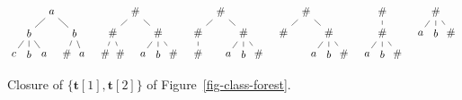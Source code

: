 \documentclass{CSML}
\newcommand\tree{\boldsymbol{t}}
\begin{document}
\begin{figure}
\[
\begin{tikzpicture}[baseline]
\node {$a$}  [level distance=7mm,
   level 1/.style={sibling distance=15mm},
   level 2/.style={sibling distance=5mm}]
 child { node {$b$}
         child { node {$c$} }
         child { node {$b$} }
         child { node {$a$} }
       }
 child { node {$b$}
         child { node {$\#$} }
         child { node {$a$} }
       };
\end{tikzpicture}
\quad\!
\begin{tikzpicture}[baseline]
\node {$\#$}[level distance=7mm,
   level 1/.style={sibling distance=15mm},
   level 2/.style={sibling distance=5mm}]
child { node {$\#$}
        child { node {$\#$} }
        child { node {$\#$} }
      }
child { node {$\#$}
        child { node {$a$} }
        child { node {$b$} }
        child { node {$\#$} }
      };
\end{tikzpicture}
\quad\!
\begin{tikzpicture}[baseline]
\node {$\#$}[level distance=7mm,
   level 1/.style={sibling distance=15mm},
   level 2/.style={sibling distance=5mm}]
child { node {$\#$}
        child { node {$\#$} }
      }
child { node {$\#$}
        child { node {$a$} }
        child { node {$b$} }
        child { node {$\#$} }
      };
\end{tikzpicture}
\quad\!
\begin{tikzpicture}[baseline]
\node {$\#$}[level distance=7mm,
   level 1/.style={sibling distance=15mm},
   level 2/.style={sibling distance=5mm}]
child { node {$\#$} }
child { node {$\#$}
        child { node {$a$} }
        child { node {$b$} }
        child { node {$\#$} }
      };
\end{tikzpicture}
\quad\!
\begin{tikzpicture}[baseline]
\node {$\#$}[level distance=7mm,
   level 1/.style={sibling distance=15mm},
   level 2/.style={sibling distance=5mm}]
child { node {$\#$}
        child { node {$a$} }
        child { node {$b$} }
        child { node {$\#$} }
      };
\end{tikzpicture}
\quad\!
\begin{tikzpicture}[baseline]
\node {$\#$}[level distance=7mm,
   level 1/.style={sibling distance=5mm},
   level 2/.style={sibling distance=5mm}]
         child { node {$a$} }
         child { node {$b$} }
         child { node {$\#$} };
\end{tikzpicture}
\]
\caption{Closure of $\{ \tree[1], \tree[2] \}$ of Figure~\ref{fig-class-forest}.}
\label{fig-class-closure}
\end{figure}
\end{document}
